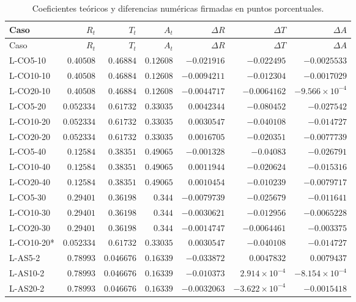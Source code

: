 \begingroup\small\setlength{\tabcolsep}{4pt}
\begin{longtable}{lrrrrrr}
\caption{Coeficientes teóricos y diferencias numéricas firmadas en puntos porcentuales.}\label{t:lamt}\\
\hline Caso & $R_t$ & $T_t$ & $A_t$ & $\Delta R$ & $\Delta T$ & $\Delta A$ \\ \hline\endfirsthead
\hline Caso & $R_t$ & $T_t$ & $A_t$ & $\Delta R$ & $\Delta T$ & $\Delta A$ \\ \hline\endhead
L-CO5-10 & $0.40508$ & $0.46884$ & $0.12608$ & $-0.021916$ & $-0.022495$ & $-0.0025533$ \\
L-CO10-10 & $0.40508$ & $0.46884$ & $0.12608$ & $-0.0094211$ & $-0.012304$ & $-0.0017029$ \\
L-CO20-10 & $0.40508$ & $0.46884$ & $0.12608$ & $-0.0044717$ & $-0.0064162$ & $-9.566\times 10^{-4}$ \\
L-CO5-20 & $0.052334$ & $0.61732$ & $0.33035$ & $0.0042344$ & $-0.080452$ & $-0.027542$ \\
L-CO10-20 & $0.052334$ & $0.61732$ & $0.33035$ & $0.0030547$ & $-0.040108$ & $-0.014727$ \\
L-CO20-20 & $0.052334$ & $0.61732$ & $0.33035$ & $0.0016705$ & $-0.020351$ & $-0.0077739$ \\
L-CO5-40 & $0.12584$ & $0.38351$ & $0.49065$ & $-0.001328$ & $-0.04083$ & $-0.026791$ \\
L-CO10-40 & $0.12584$ & $0.38351$ & $0.49065$ & $0.0011944$ & $-0.020624$ & $-0.015316$ \\
L-CO20-40 & $0.12584$ & $0.38351$ & $0.49065$ & $0.0010454$ & $-0.010239$ & $-0.0079717$ \\
L-CO5-30 & $0.29401$ & $0.36198$ & $0.344$ & $-0.0079739$ & $-0.025679$ & $-0.011641$ \\
L-CO10-30 & $0.29401$ & $0.36198$ & $0.344$ & $-0.0030621$ & $-0.012956$ & $-0.0065228$ \\
L-CO20-30 & $0.29401$ & $0.36198$ & $0.344$ & $-0.0014747$ & $-0.0064461$ & $-0.003375$ \\
L-CO10-20* & $0.052334$ & $0.61732$ & $0.33035$ & $0.0030547$ & $-0.040108$ & $-0.014727$ \\
L-AS5-2 & $0.78993$ & $0.046676$ & $0.16339$ & $-0.033872$ & $0.0047832$ & $0.0079437$ \\
L-AS10-2 & $0.78993$ & $0.046676$ & $0.16339$ & $-0.010373$ & $2.914\times 10^{-4}$ & $-8.154\times 10^{-4}$ \\
L-AS20-2 & $0.78993$ & $0.046676$ & $0.16339$ & $-0.0032063$ & $-3.622\times 10^{-4}$ & $-0.0015418$ \\

\end{longtable}
